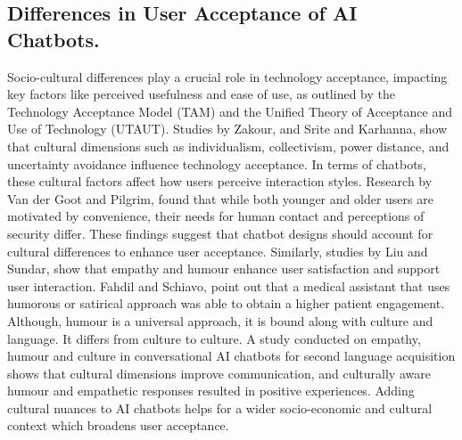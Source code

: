\documentclass[conference]{IEEEtran}
\begin{document}
\subsection{Differences in User Acceptance of AI Chatbots.}
Socio-cultural differences play a crucial role in technology acceptance, impacting key factors like perceived usefulness and ease of use, as outlined by the Technology Acceptance Model (TAM) and the Unified Theory of Acceptance and Use of Technology (UTAUT). Studies by Zakour\cite{b10}, and Srite and Karhanna\cite{b11}, show that cultural dimensions such as individualism, collectivism, power distance, and uncertainty avoidance influence technology acceptance. In terms of chatbots, these cultural factors affect how users perceive interaction styles. Research by Van der Goot and Pilgrim\cite{b12}, found that while both younger and older users are motivated by convenience, their needs for human contact and perceptions of security differ. These findings suggest that chatbot designs should account for cultural differences to enhance user acceptance\cite{b13}. Similarly, studies by Liu and Sundar\cite{b14}, show that empathy and humour enhance user satisfaction and support user interaction. Fahdil and Schiavo\cite{b15}, point out that a medical assistant that uses humorous or satirical approach was able to obtain a higher patient engagement. Although, humour is a universal approach, it is bound along with culture and language. It differs from culture to culture. A study conducted on empathy, humour and culture in conversational AI chatbots for second language acquisition shows that cultural dimensions improve communication, and culturally aware humour and empathetic responses resulted in positive experiences. Adding cultural nuances to AI chatbots helps for a wider socio-economic and cultural context which broadens user acceptance\cite{b16}.
\end{document}

